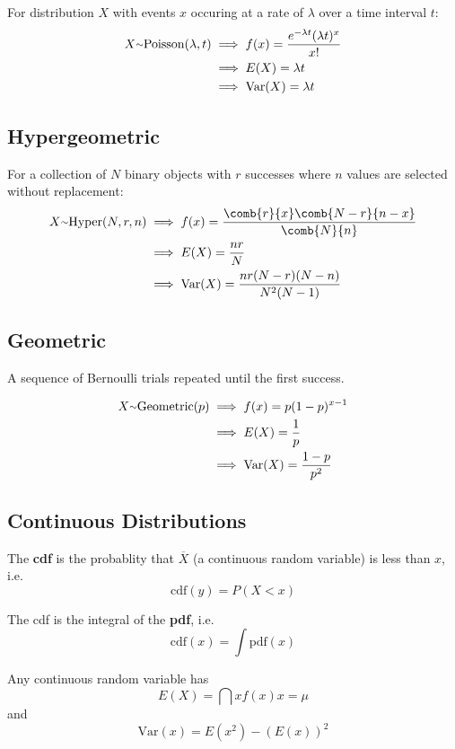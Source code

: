 \documentclass[12pt]{article}
\begin{document}
For distribution $X$ with events $x$ occuring at a rate of $\lambda$ over a time interval $t$:
\begin{align*}
X \ttilde \text{Poisson}(\lambda, t) &\implies f(x) = \frac{e^{-\lambda t} (\lambda t)^x}{x!}\\
                                     &\implies E(X) = \lambda t\\
                                     &\implies \text{Var}(X) = \lambda t
\end{align*}

\subsection*{Hypergeometric}
For a collection of $N$ binary objects with $r$ successes where $n$ values are selected without replacement:
\begin{align*}
X \ttilde \text{Hyper}(N, r, n) &\implies f(x) = \frac{\comb{r}{x} \comb{N-r}{n-x}}{\comb{N}{n}}\\
                                &\implies E(X) = \frac{nr}{N}\\
                                &\implies \text{Var}(X) = \frac{nr(N-r)(N-n)}{N^2(N-1)}
\end{align*}

\subsection*{Geometric}
A sequence of Bernoulli trials repeated until the first success.

\begin{align*}
X \ttilde \text{Geometric}(p) &\implies f(x) = p(1-p)^{x-1}\\
                              &\implies E(X) = \frac{1}{p}\\
                              &\implies \text{Var}(X) = \frac{1-p}{p^2}
\end{align*}

\subsection*{Continuous Distributions}
The {\bf cdf} is the probablity that $\overline{X}$ (a continuous random variable) is less than $x$, i.e. \[ \text{cdf}(y) = P(X < x) \]

The cdf is the integral of the {\bf pdf}, i.e. \[ \text{cdf}(x) = \int{\text{pdf}(x)} \]

Any continuous random variable has \[ E(X) = \dint{x}{}{f(x)}{x} = \mu \] and \[ \text{Var}(x) = E(x^2) - (E(x))^2 \]
\end{document}
